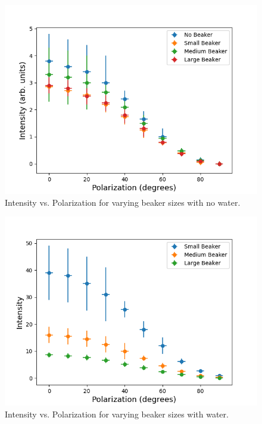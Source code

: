\begin{figure}[H]
    \begin{center}
        \includegraphics[width=\columnwidth]{../figures/no_water.png}
    \end{center}
    \caption{Intensity vs. Polarization for varying beaker sizes with no water.}
    \label{fig:no_water}
\end{figure}

\begin{figure}[H]
    \begin{center}
        \includegraphics[width=\columnwidth]{../figures/water.png}
    \end{center}
    \caption{Intensity vs. Polarization for varying beaker sizes with water.}
    \label{fig:water}
\end{figure}

